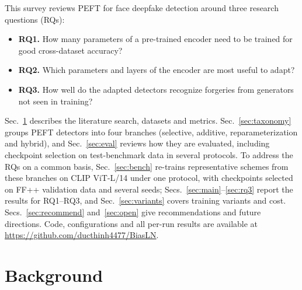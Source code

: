 \documentclass[fonts]{icst}
\begin{document}
This survey reviews PEFT for face deepfake detection around three research questions (RQs):
\begin{itemize}[leftmargin=*, topsep=2pt, itemsep=2pt]
    \item \textbf{RQ1.} How many parameters of a pre-trained encoder need to be trained for good cross-dataset accuracy?
    \item \textbf{RQ2.} Which parameters and layers of the encoder are most useful to adapt?
    \item \textbf{RQ3.} How well do the adapted detectors recognize forgeries from generators not seen in training?
\end{itemize}
Sec.~\ref{sec:background} describes the literature search, datasets and metrics. Sec.~\ref{sec:taxonomy} groups PEFT detectors into four branches (selective, additive, reparameterization and hybrid), and Sec.~\ref{sec:eval} reviews how they are evaluated, including checkpoint selection on test-benchmark data in several protocols. To address the RQs on a common basis, Sec.~\ref{sec:bench} re-trains representative schemes from these branches on CLIP ViT-L/14 under one protocol, with checkpoints selected on FF++ validation data and several seeds; Secs.~\ref{sec:main}--\ref{sec:rq3} report the results for RQ1--RQ3, and Sec.~\ref{sec:variants} covers training variants and cost. Secs.~\ref{sec:recommend} and~\ref{sec:open} give recommendations and future directions.
Code, configurations and all per-run results are available at \href{https://github.com/ducthinh4477/BiasLN}{https://github.com/ducthinh4477/BiasLN}.

\section{Background}
\label{sec:background}
\end{document}
